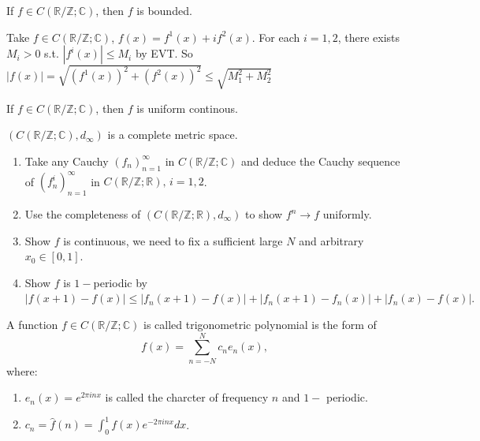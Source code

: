 \documentclass[12pt]{article}
\begin{document}
\begin{theorem}
    If $f\in C(\mathbb{R}/\mathbb{Z}; \mathbb{C})$, then $f$ is bounded.
\end{theorem}

\begin{pfbox}
     Take $f\in C(\mathbb{R}/\mathbb{Z}; \mathbb{C})$, $f(x)=f^1(x)+if^2(x).$
     For each $i=1,2$, there exists $M_i>0$ s.t. $|f^i(x)|\le M_i$ by EVT.
     So $|f(x)|=\sqrt{(f^1(x))^2 + (f^2(x))^2}\le \sqrt{M^2_1 + M^2_2}$
\end{pfbox}


\begin{theorem}
    If $f\in C(\mathbb{R}/\mathbb{Z}; \mathbb{C})$, then $f$ is uniform continous.
\end{theorem}

\begin{theorem}
 $(C(\mathbb{R}/\mathbb{Z}; \mathbb{C}), d_\infty)$ is a complete metric space.
\end{theorem}

\begin{pfbox}
        \begin{enumerate}
            \item Take any Cauchy $(f_n)^{\infty}_{n=1}$ in $C(\mathbb{R}/\mathbb{Z}; \mathbb{C})$ and deduce the Cauchy sequence of $(f^i_n)^{\infty}_{n=1}$ in $C(\mathbb{R}/\mathbb{Z}; \mathbb{R}),\, i=1,2$.
            \item Use the completeness of $(C(\mathbb{R}/\mathbb{Z}; \mathbb{R}) ,d_\infty)$ to show $f^n\rightarrow f$ uniformly.
            \item Show $f$ is continuous, we need to fix a sufficient large $N$ and arbitrary $x_0\in [0,1]$.
            \item Show $f$ is $1-$periodic by $|f(x+1)-f(x)|\le |f_n(x+1)-f(x)| + |f_n(x+1)-f_n(x)| + |f_n(x)-f(x)|.$
        \end{enumerate}
\end{pfbox}




\begin{definition}
A function $f\in C(\mathbb{R}/\mathbb{Z}; \mathbb{C})$ is called trigonometric polynomial is the form of
\[f(x)=\sum_{n=-N}^{N}c_n e_n(x),\] where:
\begin{enumerate}
    \item $e_n(x)=e^{2\pi inx}$ is called the charcter of frequency $n$ and $1-$ periodic.
    \item $c_n=\hat{f}(n)=\int_{0}^{1}f(x)e^{-2\pi inx}dx$.
\end{enumerate}
\end{definition}
\end{document}
